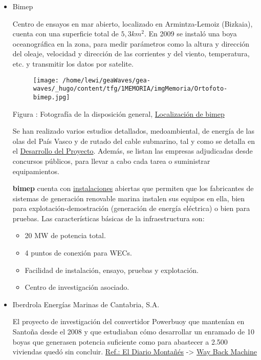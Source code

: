 \documentclass[]{article}
\begin{document}
\begin{itemize}
\item
  Bimep

  Centro de ensayos en mar abierto, localizado en Armintza-Lemoiz
  (Bizkaia), cuenta con una superficie total de \(5,3 km^2\). En 2009 se
  instaló una boya oceanográfica en la zona, para medir parámetros como
  la altura y dirección del oleaje, velocidad y dirección de las
  corrientes y del viento, temperatura, etc. y transmitir los datos por
  satelite.

  \begin{figure}
  \centering
  \texttt{[image: /home/lewi/geaWaves/gea-waves/\_hugo/content/tfg/1MEMORIA/imgMemoria/Ortofoto-bimep.jpg]}
  \caption{}
  \end{figure}

  Figura : Fotografía de la disposición general,
  \href{http://bimep.com/sobre-bimep/localizacion-de-bimep/}{Localización
  de bimep}

  Se han realizado varios estudios detallados, medoambiental, de energía
  de las olas del País Vasco y de rutado del cable submarino, tal y como
  se detalla en el
  \href{http://bimep.com/sobre-bimep/desarrollo-del-proyecto/}{Desarrollo
  del Proyecto}. Además, se listan las empresas adjudicadas desde
  concursos públicos, para llevar a cabo cada tarea o suministrar
  equipamientos.

  \textbf{bimep} cuenta con
  \href{http://bimep.com/sobre-bimep/instalaciones/}{instalaciones}
  abiertas que permiten que los fabricantes de sistemas de generación
  renovable marina instalen sus equipos en ella, bien para
  explotación-demostración (generación de energía eléctrica) o bien para
  pruebas. Las características básicas de la infraestructura son:

  \begin{itemize}
  \item
    20 MW de potencia total.
  \item
    4 puntos de conexión para WECs.
  \item
    Facilidad de instalación, ensayo, pruebas y explotación.
  \item
    Centro de investigación asociado.
  \end{itemize}
\item
  Iberdrola Energías Marinas de Cantabria, S.A.

  El proyecto de investigación del convertidor Powerbuoy que mantenían
  en Santoña desde el 2008 y que estudiaban cómo desarrollar un enramado
  de 10 boyas que generasen potencia suficiente como para abastecer a
  2.500 viviendas quedó sin concluir.
  \href{http://www.eldiariomontanes.es/20131116/local/castro-oriental/abandono-proyecto-iberdrola-santona-201311161639.html}{Ref.:
  El Diario Montañés} -\textgreater{}
  \href{https://web.archive.org/web/20170904012830/http://www.eldiariomontanes.es/20131116/local/castro-oriental/abandono-proyecto-iberdrola-santona-201311161639.html}{Way
  Back Machine}


\end{itemize}
\end{document}
